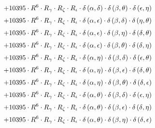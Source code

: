 \begin{subequations}
\begin{gather}
 \\[0.2em] \notag 		 + 10395 \cdot R^{6} \cdot R_{\gamma{}} \cdot R_{\zeta{}} \cdot R_{\iota{}} \cdot \delta{}\left(\alpha{}, \delta{}\right) \cdot \delta{}\left(\beta{}, \theta{}\right) \cdot \delta{}\left(\epsilon{}, \eta{}\right) 
 \\[0.2em] \notag 		 + 10395 \cdot R^{6} \cdot R_{\gamma{}} \cdot R_{\zeta{}} \cdot R_{\iota{}} \cdot \delta{}\left(\alpha{}, \epsilon{}\right) \cdot \delta{}\left(\beta{}, \delta{}\right) \cdot \delta{}\left(\eta{}, \theta{}\right) 
 \\[0.2em] \notag 		 + 10395 \cdot R^{6} \cdot R_{\gamma{}} \cdot R_{\zeta{}} \cdot R_{\iota{}} \cdot \delta{}\left(\alpha{}, \epsilon{}\right) \cdot \delta{}\left(\beta{}, \eta{}\right) \cdot \delta{}\left(\delta{}, \theta{}\right) 
 \\[0.2em] \notag 		 + 10395 \cdot R^{6} \cdot R_{\gamma{}} \cdot R_{\zeta{}} \cdot R_{\iota{}} \cdot \delta{}\left(\alpha{}, \epsilon{}\right) \cdot \delta{}\left(\beta{}, \theta{}\right) \cdot \delta{}\left(\delta{}, \eta{}\right) 
 \\[0.2em] \notag 		 + 10395 \cdot R^{6} \cdot R_{\gamma{}} \cdot R_{\zeta{}} \cdot R_{\iota{}} \cdot \delta{}\left(\alpha{}, \eta{}\right) \cdot \delta{}\left(\beta{}, \delta{}\right) \cdot \delta{}\left(\epsilon{}, \theta{}\right) 
 \\[0.2em] \notag 		 + 10395 \cdot R^{6} \cdot R_{\gamma{}} \cdot R_{\zeta{}} \cdot R_{\iota{}} \cdot \delta{}\left(\alpha{}, \eta{}\right) \cdot \delta{}\left(\beta{}, \epsilon{}\right) \cdot \delta{}\left(\delta{}, \theta{}\right) 
 \\[0.2em] \notag 		 + 10395 \cdot R^{6} \cdot R_{\gamma{}} \cdot R_{\zeta{}} \cdot R_{\iota{}} \cdot \delta{}\left(\alpha{}, \eta{}\right) \cdot \delta{}\left(\beta{}, \theta{}\right) \cdot \delta{}\left(\delta{}, \epsilon{}\right) 
 \\[0.2em] \notag 		 + 10395 \cdot R^{6} \cdot R_{\gamma{}} \cdot R_{\zeta{}} \cdot R_{\iota{}} \cdot \delta{}\left(\alpha{}, \theta{}\right) \cdot \delta{}\left(\beta{}, \delta{}\right) \cdot \delta{}\left(\epsilon{}, \eta{}\right) 
 \\[0.2em] \notag 		 + 10395 \cdot R^{6} \cdot R_{\gamma{}} \cdot R_{\zeta{}} \cdot R_{\iota{}} \cdot \delta{}\left(\alpha{}, \theta{}\right) \cdot \delta{}\left(\beta{}, \epsilon{}\right) \cdot \delta{}\left(\delta{}, \eta{}\right) 
 \\[0.2em] \notag 		 + 10395 \cdot R^{6} \cdot R_{\gamma{}} \cdot R_{\zeta{}} \cdot R_{\iota{}} \cdot \delta{}\left(\alpha{}, \theta{}\right) \cdot \delta{}\left(\beta{}, \eta{}\right) \cdot \delta{}\left(\delta{}, \epsilon{}\right) 

\end{gather}
\end{subequations}
